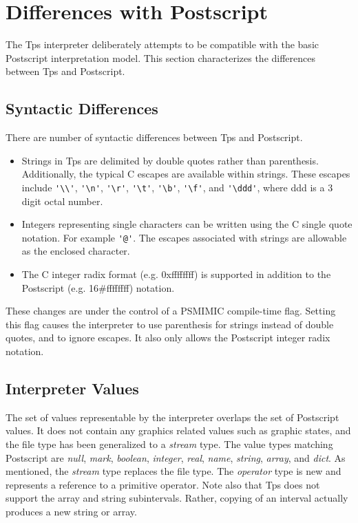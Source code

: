 \section{Differences with Postscript}
The Tps interpreter deliberately attempts to be compatible with the
basic Postscript interpretation model.
This section characterizes the differences between Tps and Postscript. 

\subsection{Syntactic Differences}
There are number of syntactic differences between Tps and Postscript. 
\begin{itemize}

\item Strings in Tps are delimited by double quotes
rather than parenthesis.  Additionally, the typical C escapes
are available within strings.  These escapes include
\verb|'\\'|,
\verb|'\n'|,
\verb|'\r'|,
\verb|'\t'|,
\verb|'\b'|,
\verb|'\f'|,
and
\verb|'\ddd'|, where ddd is a 3 digit octal number.

\item Integers representing single characters can be
written using the C single quote notation.
For example \verb|'@'|.
The escapes associated with strings are allowable as the enclosed character.

\item The C integer radix format (e.g. 0xffffffff) is supported
in addition to the Postscript (e.g. 16\#ffffffff) notation.
\end{itemize}
These changes are under
the control of a PSMIMIC compile-time flag.  Setting this flag
causes the interpreter to use parenthesis for strings instead
of double quotes, and to ignore escapes.  It also
only allows the Postscript integer radix notation.

\subsection{Interpreter Values}
The set of values representable by the interpreter overlaps
the set of Postscript values.  It does not contain any graphics
related values such as graphic states, and the file type has been
generalized to a {\em stream} type.
The value types matching Postscript are
{\em null},
{\em mark},
{\em boolean},
{\em integer},
{\em real},
{\em name},
{\em string},
{\em array},
and
{\em dict}.
As mentioned, the {\em stream} type replaces the file type.
The {\em operator} type is new and represents a reference to
a primitive operator.
Note also that Tps does not support the array and string subintervals.
Rather, copying of an interval actually produces a new string
or array.

